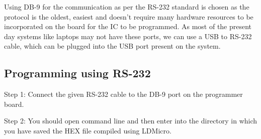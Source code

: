 \documentclass[12pt]{article}
\begin{document}
Using DB-9 for the communication as per the RS-232 standard is chosen as the protocol is the oldest, easiest and doesn't require many hardware resources to be incorporated on the board for the IC to be programmed. As most of the present day systems like laptops may not have these ports, we can use a USB to RS-232 cable, which can be plugged into the USB port present on the system. 


\subsection{Programming using RS-232}
\vspace{12pt}
\hspace{17pt}Step 1: Connect the given RS-232 cable to the DB-9 port on the programmer board.

\vspace{12pt}
Step 2: You should open command line and then enter into the directory in which you have saved the HEX file compiled using LDMicro.  
\end{document}

